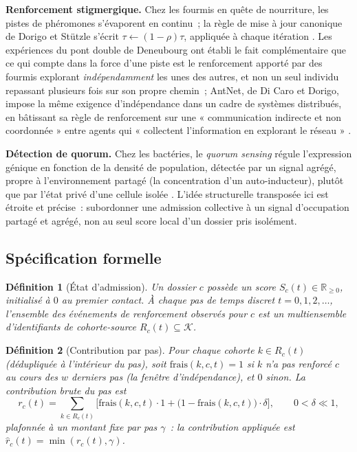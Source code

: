 \documentclass[11pt]{article}
\newtheorem{definition}{Définition}
\begin{document}
\textbf{Renforcement stigmergique.} Chez les fourmis en quête de
nourriture, les pistes de phéromones s'évaporent en continu~; la règle de
mise à jour canonique de Dorigo et Stützle s'écrit
$\tau \leftarrow (1-\rho)\tau$, appliquée à chaque itération
\cite{dorigo2004}. Les expériences du pont double de Deneubourg ont établi
le fait complémentaire que ce qui compte dans la force d'une piste est le
renforcement apporté par des fourmis explorant \emph{indépendamment} les
unes des autres, et non un seul individu repassant plusieurs fois sur son
propre chemin~; AntNet, de Di Caro et Dorigo, impose la même exigence
d'indépendance dans un cadre de systèmes distribués, en bâtissant sa
règle de renforcement sur une « communication indirecte et non
coordonnée » entre agents qui « collectent l'information en explorant le
réseau » \cite{dicaro1998}.

\textbf{Détection de quorum.} Chez les bactéries, le \emph{quorum
sensing} régule l'expression génique en fonction de la densité de
population, détectée par un signal agrégé, propre à l'environnement
partagé (la concentration d'un auto-inducteur), plutôt que par l'état
privé d'une cellule isolée \cite{miller2001}. L'idée structurelle
transposée ici est étroite et précise~: subordonner une admission
collective à un signal d'occupation partagé et agrégé, non au seul score
local d'un dossier pris isolément.

\subsection{Spécification formelle}

\begin{definition}[État d'admission]
Un dossier $c$ possède un score $S_c(t) \in \mathbb{R}_{\geq 0}$,
initialisé à $0$ au premier contact. À chaque pas de temps discret
$t = 0, 1, 2, \dots$, l'ensemble des événements de renforcement observés
pour $c$ est un multiensemble d'identifiants de cohorte-source
$R_c(t) \subseteq \mathcal{K}$.
\end{definition}

\begin{definition}[Contribution par pas]
Pour chaque cohorte $k \in R_c(t)$ (dédupliquée à l'intérieur du pas),
soit $\mathrm{frais}(k,c,t) = 1$ si $k$ n'a pas renforcé $c$ au cours des
$w$ derniers pas (la fenêtre d'indépendance), et $0$ sinon. La
contribution brute du pas est
\[
r_c(t) = \sum_{k \in R_c(t)} \big[ \mathrm{frais}(k,c,t)\cdot 1 +
\big(1-\mathrm{frais}(k,c,t)\big)\cdot \delta \big],
\qquad 0 < \delta \ll 1,
\]
plafonnée à un montant fixe par pas $\gamma$~: la contribution appliquée
est $\hat r_c(t) = \min(r_c(t), \gamma)$.
\end{definition}
\end{document}
